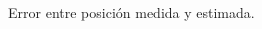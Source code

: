 \documentclass[a4paper, 10pt, onecolumn,journal]{ieeeconf}
\begin{document}
\begin{figure}[H]
	\centering
	\begin{adjustbox}{scale=0.65,max width=\columnwidth}
	\end{adjustbox}
	\caption{Error entre posición medida y estimada.}
	\label{Error entre posición medida y observada}
\end{figure}
\end{document}
